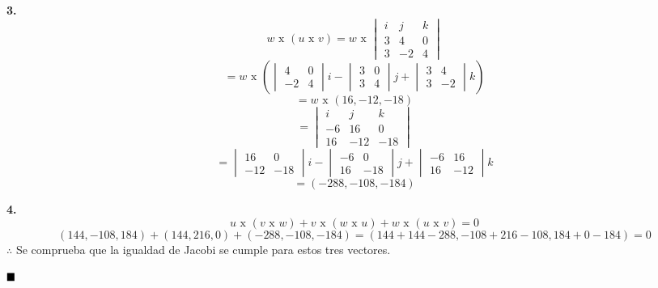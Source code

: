 \documentclass{article}
\begin{document}
   \textbf{3.}
   $$w \text{ x }(u \text{ x } v) = w \text{ x } \begin{vmatrix}
       i & j & k \\
       3 & 4 & 0 \\
       3 & -2 & 4
   \end{vmatrix}$$
   $$= w \text{ x } \left(\begin{vmatrix}
       4 & 0 \\
       -2 & 4
   \end{vmatrix}i - \begin{vmatrix}
       3 & 0 \\
       3 & 4
   \end{vmatrix}j+ \begin{vmatrix}
       3 & 4 \\
       3 & -2
   \end{vmatrix}k\right)$$
   $$= w \text{ x }(16, -12, -18)$$
   $$= \begin{vmatrix}
       i & j & k \\
       -6 & 16 & 0 \\
       16 & -12 & -18
   \end{vmatrix}$$
   $$= \begin{vmatrix}
       16 & 0 \\
       -12 & -18
   \end{vmatrix}i- \begin{vmatrix}
       -6 & 0 \\
       16 & -18
   \end{vmatrix}j + \begin{vmatrix}
       -6 & 16 \\
       16 & -12
   \end{vmatrix}k$$
   $$ =(-288, -108, -184)$$


   \textbf{4.}
   $$u \text{ x }(v \text{ x } w) + v \text{ x }(w \text{ x } u) + w \text{ x }(u \text{ x } v) = 0$$
   $$(144, -108, 184)+ (144, 216, 0)+ (-288, -108, -184) = (144+144-288, -108+216-108, 184+0-184) = 0$$
   $\therefore$ Se comprueba que la igualdad de Jacobi se cumple para estos tres vectores.
  
   $\hfill\blacksquare$
\end{document}
